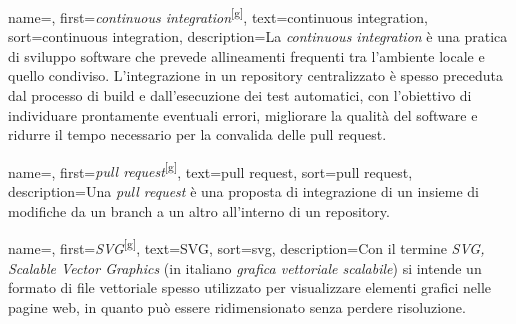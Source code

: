  {
    name=,
    first={\textit{continuous integration}\textsuperscript{[g]}},
    text=continuous integration,
    sort=continuous integration,
    description={La \textit{continuous integration} è una pratica di sviluppo software che prevede allineamenti frequenti tra l’ambiente locale e quello condiviso. L’integrazione in un repository centralizzato è spesso preceduta dal processo di build e dall’esecuzione dei test automatici, con l’obiettivo di individuare prontamente eventuali errori, migliorare la qualità del software e ridurre il tempo necessario per la convalida delle pull request.}
}

 {
    name=,
    first={\textit{pull request}\textsuperscript{[g]}},
    text=pull request,
    sort=pull request,
    description={Una \textit{pull request} è una proposta di integrazione di un insieme di modifiche da un branch a un altro all’interno di un repository.}
}

 {
    name=,
    first={\textit{SVG}\textsuperscript{[g]}},
    text=SVG,
    sort=svg,
    description={Con il termine \textit{SVG, Scalable Vector Graphics} (in italiano \textit{grafica vettoriale scalabile}) si intende un formato di file vettoriale spesso utilizzato per visualizzare elementi grafici nelle pagine web, in quanto può essere ridimensionato senza perdere risoluzione.}
}
